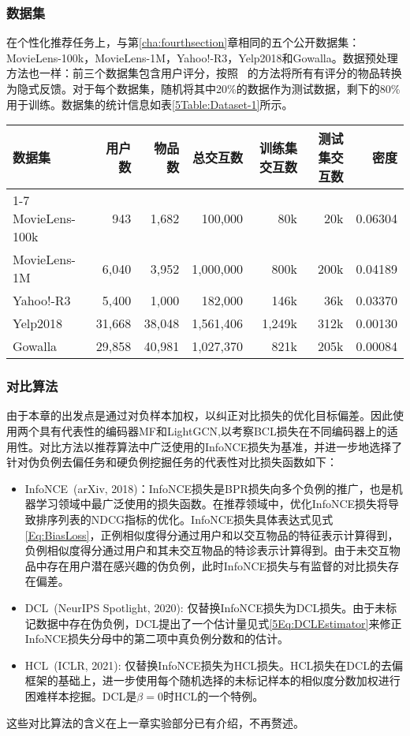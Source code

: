 \subsubsection{数据集}
在个性化推荐任务上，与第\ref{cha:fourthsection}章相同的五个公开数据集：MovieLens-100k，MovieLens-1M，Yahoo!-R3，Yelp2018和Gowalla。数据预处理方法也一样：前三个数据集包含用户评分，按照~\cite{Steffen:2009:UAI,Zhang:2013:SIGIR,Steffen:2014:WSDM} 的方法将所有有评分的物品转换为隐式反馈。对于每个数据集，随机将其中20\%的数据作为测试数据，剩下的80\%用于训练。数据集的统计信息如表\ref{5Table:Dataset-1}所示。
\begin{table*}[h!]
	\centering
	\small
	\caption{数据集统计信息}\label{5Table:Dataset-1}
	\begin{tabular}{lrrrrrr}
		\toprule[1.2pt]
		数据集          & 用户数  & 物品数  &总交互数 & 训练集交互数  &测试集交互数&密度 \\ \cline{1-7}
		MovieLens-100k   &   943    &  1,682   &100,000&    80k	   & 20k &0.06304\\
		MovieLens-1M    &   6,040  &  3,952   &1,000,000&  800k     & 200k&0.04189  \\
		Yahoo!-R3       &   5,400  &  1,000  &182,000 &   146k      & 36k&0.03370\\
		Yelp2018       &   31,668  &  38,048&   1,561,406&   1,249k     & 312k&0.00130  \\
		Gowalla       &   29,858 &  40,981  &1,027,370 &   821k     & 205k&0.00084 \\
		\bottomrule[1.2pt]
	\end{tabular}
\end{table*}
\subsubsection{对比算法}
由于本章的出发点是通过对负样本加权，以纠正对比损失的优化目标偏差。因此使用两个具有代表性的编码器MF和LightGCN,以考察BCL损失在不同编码器上的适用性。对比方法以推荐算法中广泛使用的InfoNCE损失为基准，并进一步地选择了针对伪负例去偏任务和硬负例挖掘任务的代表性对比损失函数如下：

\begin{itemize}
	\item InfoNCE~\cite{Oord:2018:arxiv}(arXiv, 2018)：InfoNCE损失是BPR损失向多个负例的推广，也是机器学习领域中最广泛使用的损失函数。在推荐领域中，优化InfoNCE损失将导致排序列表的NDCG指标的优化\cite{Jiancan:2022:arxiv}。InfoNCE损失具体表达式见式\eqref{Eq:BiasLoss}，正例相似度得分通过用户和以交互物品的特征表示计算得到，负例相似度得分通过用户和其未交互物品的特诊表示计算得到。由于未交互物品中存在用户潜在感兴趣的伪负例，此时InfoNCE损失与有监督的对比损失存在偏差。
	\item DCL~\cite{Chuang:2020:NIPS}(NeurIPS Spotlight, 2020): 仅替换InfoNCE损失为DCL损失。由于未标记数据中存在伪负例，DCL提出了一个估计量见式\eqref{5Eq:DCLEstimator}来修正InfoNCE损失分母中的第二项中真负例分数和的估计。 
	\item HCL~\cite{Robinson:2021:ICLR}(ICLR, 2021): 仅替换InfoNCE损失为HCL损失。HCL损失在DCL的去偏框架的基础上，进一步使用每个随机选择的未标记样本的相似度分数加权进行困难样本挖掘。DCL是$\beta=0$时HCL的一个特例。
\end{itemize}
这些对比算法的含义在上一章实验部分已有介绍，不再赘述。

